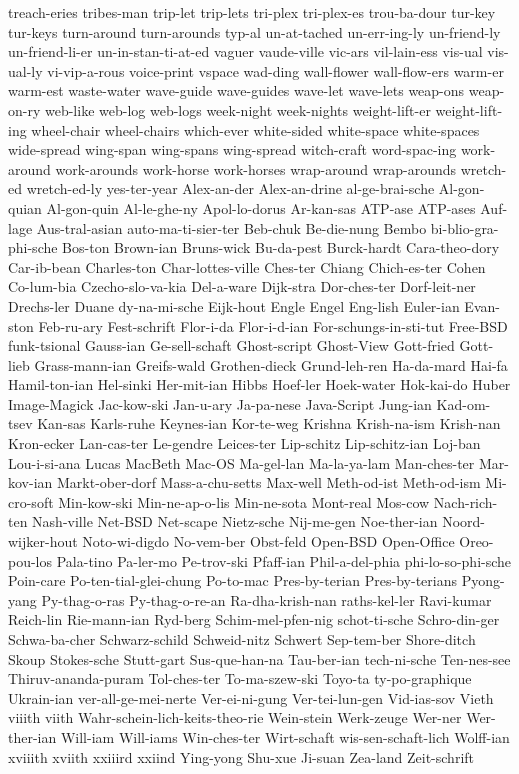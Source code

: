 {treach-eries
tribes-man
trip-let
trip-lets
tri-plex
tri-plex-es
trou-ba-dour
tur-key
tur-keys
turn-around
turn-arounds
typ-al
un-at-tached
un-err-ing-ly
un-friend-ly
un-friend-li-er
un-in-stan-ti-at-ed
vaguer
vaude-ville
vic-ars
vil-lain-ess
vis-ual
vis-ual-ly
vi-vip-a-rous
voice-print
vspace
wad-ding
wall-flower
wall-flow-ers
warm-er
warm-est
waste-water
wave-guide
wave-guides
wave-let
wave-lets
weap-ons
weap-on-ry
web-like
web-log
web-logs
week-night
week-nights
weight-lift-er
weight-lift-ing
wheel-chair
wheel-chairs
which-ever
white-sided
white-space
white-spaces
wide-spread
wing-span
wing-spans
wing-spread
witch-craft
word-spac-ing
work-around
work-arounds
work-horse
work-horses
wrap-around
wrap-arounds
wretch-ed
wretch-ed-ly
yes-ter-year
Alex-an-der
Alex-an-drine
al-ge-brai-sche
Al-gon-quian
Al-gon-quin
Al-le-ghe-ny
Apol-lo-dorus
Ar-kan-sas
ATP-ase
ATP-ases
Auf-lage
Aus-tral-asian
auto-ma-ti-sier-ter
Beb-chuk
Be-die-nung
Bembo
bi-blio-gra-phi-sche
Bos-ton
Brown-ian
Bruns-wick
Bu-da-pest
Burck-hardt
Cara-theo-dory
Car-ib-bean
Charles-ton
Char-lottes-ville
Ches-ter
Chiang
Chich-es-ter
Cohen
Co-lum-bia
Czecho-slo-va-kia
Del-a-ware
Dijk-stra
Dor-ches-ter
Dorf-leit-ner
Drechs-ler
Duane
dy-na-mi-sche
Eijk-hout
Engle
Engel
Eng-lish
Euler-ian
Evan-ston
Feb-ru-ary
Fest-schrift
Flor-i-da
Flor-i-d-ian
For-schungs-in-sti-tut
Free-BSD
funk-tsional
Gauss-ian
Ge-sell-schaft
Ghost-script
Ghost-View
Gott-fried
Gott-lieb
Grass-mann-ian
Greifs-wald
Grothen-dieck
Grund-leh-ren
Ha-da-mard
Hai-fa
Hamil-ton-ian
Hel-sinki
Her-mit-ian
Hibbs
Hoef-ler
Hoek-water
Hok-kai-do
Huber
Image-Magick
Jac-kow-ski
Jan-u-ary
Ja-pa-nese
Java-Script
Jung-ian
Kad-om-tsev
Kan-sas
Karls-ruhe
Keynes-ian
Kor-te-weg
Krishna
Krish-na-ism
Krish-nan
Kron-ecker
Lan-cas-ter
Le-gendre
Leices-ter
Lip-schitz
Lip-schitz-ian
Loj-ban
Lou-i-si-ana
Lucas
MacBeth
Mac-OS
Ma-gel-lan
Ma-la-ya-lam
Man-ches-ter
Mar-kov-ian
Markt-ober-dorf
Mass-a-chu-setts
Max-well
Meth-od-ist
Meth-od-ism
Mi-cro-soft
Min-kow-ski
Min-ne-ap-o-lis
Min-ne-sota
Mont-real
Mos-cow
Nach-rich-ten
Nash-ville
Net-BSD
Net-scape
Nietz-sche
Nij-me-gen
Noe-ther-ian
Noord-wijker-hout
Noto-wi-digdo
No-vem-ber
Obst-feld
Open-BSD
Open-Office
Oreo-pou-los
Pala-tino
Pa-ler-mo
Pe-trov-ski
Pfaff-ian
Phil-a-del-phia
phi-lo-so-phi-sche
Poin-care
Po-ten-tial-glei-chung
Po-to-mac
Pres-by-terian
Pres-by-terians
Pyong-yang
Py-thag-o-ras
Py-thag-o-re-an
Ra-dha-krish-nan
raths-kel-ler
Ravi-kumar
Reich-lin
Rie-mann-ian
Ryd-berg
Schim-mel-pfen-nig
schot-ti-sche
Schro-din-ger
Schwa-ba-cher
Schwarz-schild
Schweid-nitz
Schwert
Sep-tem-ber
Shore-ditch
Skoup
Stokes-sche
Stutt-gart
Sus-que-han-na
Tau-ber-ian
tech-ni-sche
Ten-nes-see
Thiruv-ananda-puram
Tol-ches-ter
To-ma-szew-ski
Toyo-ta
ty-po-graphique
Ukrain-ian
ver-all-ge-mei-nerte
Ver-ei-ni-gung
Ver-tei-lun-gen
Vid-ias-sov
Vieth
viiith
viith
Wahr-schein-lich-keits-theo-rie
Wein-stein
Werk-zeuge
Wer-ner
Wer-ther-ian
Will-iam
Will-iams
Win-ches-ter
Wirt-schaft
wis-sen-schaft-lich
Wolff-ian
xviiith
xviith
xxiiird
xxiind
Ying-yong Shu-xue Ji-suan
Zea-land
Zeit-schrift
}
